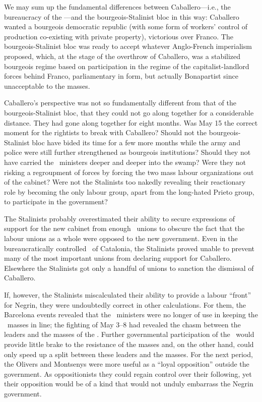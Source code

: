 We may sum up the fundamental differences between Caballero---i.e., the bureaucracy of the \UGT---and the bourgeois-Stalinist bloc in this way: Caballero wanted a bourgeois democratic republic (with some form of workers’ control of production co-existing with private property), victorious over Franco. The bourgeois-Stalinist bloc was ready to accept whatever Anglo-French imperialism proposed, which, at the stage of the overthrow of Caballero, was a stabilized bourgeois regime based on participation in the regime of the capitalist-landlord forces behind Franco, parliamentary in form, but actually Bonapartist since unacceptable to the masses.
\nowidow

Caballero’s perspective was not so fundamentally different from that of the bourgeois-Stalinist bloc, that they could not go along together for a considerable distance. They had gone along together for eight months. Was May 15 the correct moment for the rightists to break with Caballero? Should not the bourgeois-Stalinist bloc have bided its time for a few more months while the army and police were still further strengthened as bourgeois institutions? Should they not have carried the \CNT\ ministers deeper and deeper into the swamp? Were they not risking a regroupment of forces by forcing the two mass labour organizations out of the cabinet? Were not the Stalinists too nakedly revealing their reactionary role by becoming the only labour group, apart from the long-hated Prieto group, to participate in the government?

The Stalinists probably overestimated their ability to secure expressions of support for the new cabinet from enough \UGT\ unions to obscure the fact that the labour unions as a whole were opposed to the new government. Even in the bureaucratically controlled \UGT\ of Catalonia, the Stalinists proved unable to prevent many of the most important unions from declaring support for Caballero. Elsewhere the Stalinists got only a handful of unions to sanction the dismissal of Caballero.

If, however, the Stalinists miscalculated their ability to provide a labour ``front'' for Negrin, they were undoubtedly correct in other calculations. For them, the Barcelona events revealed that the \CNT\ ministers were no longer of use in keeping the \CNT\ masses in line; the fighting of May 3--8 had revealed the chasm between the leaders and the masses of the \CNT. Further governmental participation of the \CNT\ would provide little brake to the resistance of the masses and, on the other hand, could only speed up a split between these leaders and the masses. For the next period, the Olivers and Montsenys were more useful as a ``loyal opposition'' outside the government. As oppositionists they could regain control over their following, yet their opposition would be of a kind that would not unduly embarrass the Negrin government.

